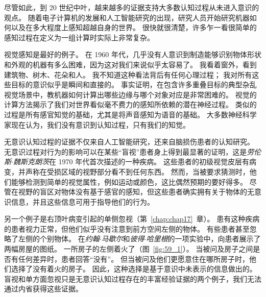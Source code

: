 尽管如此，到 20 世纪中叶，越来越多的证据支持大多数认知过程从未进入意识的观点。
随着电子计算机的发展和人工智能研究的出现，研究人员开始研究机器如何以及在多大程度上感知超越自身的世界。
很快就很清楚，许多乍一看很简单的感知过程在定义为一组计算时实际上非常复杂。


视觉感知是最好的例子。
在 1960 年代，几乎没有人意识到制造能够识别物体形状和外观的机器有多么困难，因为这对我们来说似乎太容易了。
我看着窗外，看到建筑物、树木、花朵和人。
我不知道这种看法背后有任何心理过程；
我对所有这些目标的意识似乎是瞬间和直接的。
事实证明，在包含许多重叠目标的典型杂乱视觉场景中，教机器如何计算出哪些边缘与哪个对象对应是非常困难的。
视觉的计算方法揭示了我们对世界看似毫不费力的感知所依赖的潜在神经过程。
类似的过程是所有感官知觉的基础，尤其是将声音感知为语音的基础。
大多数神经科学家现在认为，我们没有意识到认知过程，只有我们的知觉。


无意识认知过程的证据不仅来自人工智能研究，还来自脑损伤患者的认知研究。
无意识过程对行为的影响可以在某些“盲视”患者身上得到最显著的证明，这是\textit{劳伦斯$\cdot$魏斯克朗茨}在 1970 年代首次描述的一种疾病。
这些患者的初级视觉皮层有病变，并声称在受损区域的视野部分看不到任何东西。
然而，当被要求猜测时，他们能够检测到简单的视觉属性，例如运动或颜色，这比偶然预期的要好得多。
尽管在视野的盲区对物体没有基于感官的感知，但这些患者确实拥有关于物体的无意识信息，并且这些信息可用于指导他们的行为。


另一个例子是右顶叶病变引起的单侧忽视（第~\ref{chap:chap17}~章）。
患有这种疾病的患者视力正常，但他们似乎没有注意到前方空间左侧的物体。
有些患者甚至忽略了左侧的个别物体。
在\textit{约翰$\cdot$马歇尔}和\textit{彼得$\cdot$哈里根}的一项实验中，向患者展示了两幅房屋的图纸。
一所房子的左侧着火了（图~\ref{fig:59_1}）。
当被问及房子之间是否有任何差异时，患者回答“没有”。 但当被问及他们更愿意住在哪所房子时，他们选择了没有着火的房子。
因此，这种选择是基于意识中未表示的信息做出的。
盲视和单方面忽视只是无意识认知过程存在的丰富经验证据的两个例子，我们无法通过内省获得这些证据。


